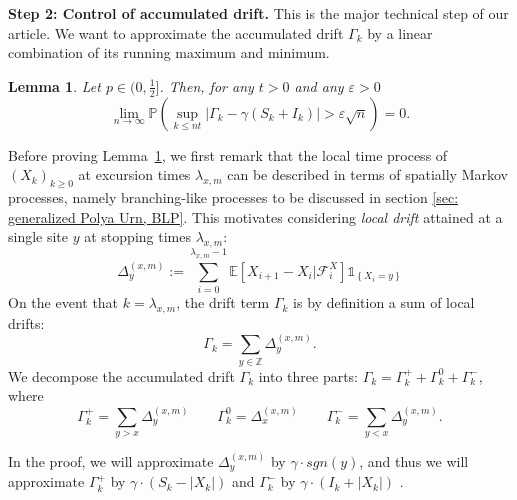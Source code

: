 \documentclass[twoside,12pt, a4paper, final]{article}
\newtheorem{lemma}{Lemma}[section]
\numberwithin{equation}{section}
\theoremstyle{remark}
\newcommand{\abs}[1]{\left\vert #1 \right\vert}
\newcommand\TBD{\textcolor{red}{TBD.}}
\newcommand{\comment}[1]{\textcolor{blue}{(Comment: #1)}}
\begin{document}
	\textbf{Step 2: Control of accumulated drift.} This is the major technical step of our article. We want to approximate the accumulated drift $\Gamma_k$ by a linear combination of its running maximum and minimum.
	\begin{lemma}\label{lm: control of acc drift}
		Let $p\in (0,\frac{1}{2}]$. Then, for any $t>0$ and any $\varepsilon >0$
		\begin{equation}\label{eq: control of acc drift}
			\lim_{n \to \infty }\mathbb{P}\left(\sup_{k\leq nt} \abs{\Gamma_k - \gamma \left(S_k + I_k \right)   } > \varepsilon \sqrt{n}  \right) =0. 
		\end{equation}
	\end{lemma}
	Before proving Lemma~\ref{lm: control of acc drift}, we first remark that the local time process of $(X_k)_{k \ge 0}$ at excursion times $\lambda_{x,m}$ can be described in terms of spatially Markov processes, namely branching-like processes to be discussed in section \ref{sec: generalized Polya Urn, BLP}. This motivates considering \textit{local drift} attained at a single site $y$ at stopping times $\lambda_{x, m}$:
	\begin{equation}\label{eq: accumulated local drift}
		\Delta_y^{(x,m)}:= \sum_{i=0}^{\lambda_{x,m}-1} \mathbb{E}\left[X_{i+1}-X_i\vert \mathcal{F}_{i}^X\right] \mathbb{1}_{\left\{X_i=y\right\}}
	\end{equation}
	On the event that $k = \lambda_{x,m}$, the drift term $\Gamma_k$ is by definition a sum of local drifts:
	\begin{equation}\label{eq: drift in terms of local drifts}
		\Gamma_k = \sum_{y\in \mathbb{Z}} \Delta_y^{(x,m)}
		.\end{equation}
	We decompose the accumulated drift $\Gamma_k$ into three parts: $\Gamma_k = 	\Gamma_k^+ +	\Gamma_k^0 + \Gamma_k^-$, where 
	\[
	\Gamma_k^{+} = \sum_{y > x} \Delta_y^{(x,m)}\qquad 
	\Gamma_k^{0} = \Delta_x^{(x,m)} \qquad
	\Gamma_k^{-} = \sum_{y < x} \Delta_y^{(x,m)}
	.\]
	\iffalse
	\begin{align*}
		\Gamma_k^{+ \phantom{0}} &= \sum_{y > x} \Delta_y^{(x,m)}\\
		\Gamma_k^{0 \phantom{+}} &= \Delta_x^{(x,m)} \\[0.6em]
		\Gamma_k^{- \phantom{0}} &= \sum_{y < x} \Delta_{y}^{(x,m)}
		.\end{align*} 
	\fi
	In the proof, we will approximate $\Delta_y^{(x,m)}$ by $\gamma\cdot sgn(y)$, and thus we will approximate $\Gamma_k^+$ by $\gamma \cdot (S_k - \abs{X_k})$ and $\Gamma_k^-$ by $ \gamma \cdot (I_k + \abs{X_k} )$
	.
	
\end{document}
